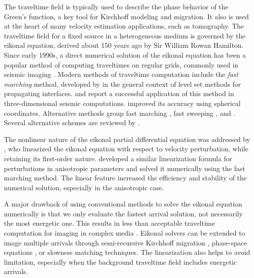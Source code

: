 The traveltime field is typically used to describe the phase behavior
of the Green's function, a key tool for Kirchhoff modeling and
migration. It also is used at the heart of many velocity estimation
applications, such as  tomography. The traveltime
field for a fixed source in a heterogeneous medium is governed by the
eikonal equation, derived about 150 years ago by Sir William Rowan
Hamilton. Since early 1990s, a direct numerical solution of the
eikonal equation has been a popular method of computing traveltimes on
regular grids, commonly used in seismic imaging
\cite[]{vidale,GEO55-05-05210526,GEO56-06-08120821,podvin.gji.91}. Modern
methods of traveltime computation include the {\it{fast marching}}
method, developed by \cite{paper2} in the general context of level set
methods for propagating interfaces. \cite{GEO64-02-05160523} and
\cite{GEO67-02-06040609} report a successful application of this
method in three-dimensional seismic computations.
\cite{GPR49-02-01650178} improved its accuracy using spherical
coordinates. Alternative methods   group fast
marching \cite[]{GEO67-04-12251231}, fast sweeping \cite[]{zhao}, and
 \cite[]{GEO67-01-01670176}.  Several
alternative schemes are reviewed by \cite{GEO67-04-12251231}. 



The nonlinear nature of the eikonal partial differential equation was
addressed by \cite{GEO59-10-16311632}, who linearized the eikonal
equation with respect to velocity perturbation, while retaining its
first-order nature. \cite{GPR50-04-03730382} developed a similar
linearization formula for perturbations in anisotropic parameters and
solved it numerically using the fast marching method.  The linear
feature increased the efficiency and stability of the numerical
solution, especially in the anisotropic case.

A major drawback of using conventional methods to solve the eikonal
equation numerically\geosout{,} is that we only evaluate the fastest arrival
solution, not necessarily the most energetic one.  This results in
less than acceptable traveltime computation for imaging in complex
media \cite[]{GEO58-04-05640575}.  Eikonal solvers can be extended to
image multiple arrivals through semi-recursive Kirchhoff migration
\cite[]{GEO62-02-05770588}, phase-space equations \cite[]{pnas}, or
slowness matching \cite[]{slowness} techniques. The linearization also
helps to avoid   limitation, especially when the background
traveltime field includes energetic arrivals.


